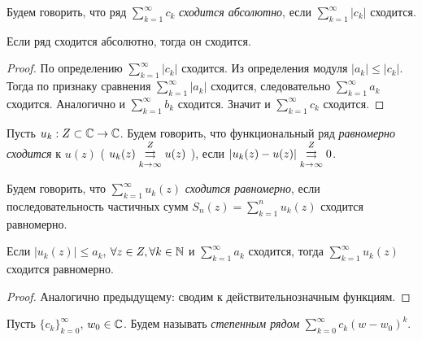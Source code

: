 \documentclass[../main.tex]{subfiles}
\begin{document}
\begin{definition}
    Будем говорить, что ряд $ \sum_{k=1}^{\infty} c_k $ \emph{сходится абсолютно}, если $ \sum_{k=1}^{\infty} \left| c_k  \right|  $ сходится.  
\end{definition}

\begin{proposition}
  Если ряд сходится абсолютно, тогда он сходится.
\end{proposition}


\begin{proof}
  По определению $ \sum_{k=1}^{\infty} \left| c_k  \right|  $ сходится. Из определения модуля $ \left| a_k \right| \leq \left| c_k  \right| $. Тогда по признаку сравнения $ \sum_{k=1}^{\infty} \left| a_k  \right| $ сходится, следовательно $ \sum_{k=1}^{\infty} a_k  $ сходится. Аналогично и $ \sum_{k=1}^{\infty} b_k  $ сходится. Значит и $ \sum_{k=1}^{\infty} c_k  $ сходится.
\end{proof}


\begin{definition}
  Пусть $ u_k : Z \subset \Cm \to \Cm$. Будем говорить, что функциональный ряд \emph{равномерно сходится} к $ u(z)$ ( $ u_k (z) \convergesuniformly{k \to \infty}{Z} u(z)$ ), если $ \left| u_k (z) - u(z) \right| \convergesuniformly{k \to \infty}{Z} 0$.  
\end{definition}


\begin{definition}
  Будем говорить, что $ \sum_{k=1}^{\infty} u_k(z)  $ \emph{ сходится равномерно}, если последовательность частичных сумм $ S_n(z) = \sum_{k=1}^{n} u_k(z)  $  сходится равномерно.
\end{definition}


\begin{proposition}
  Если $ \left| u_k(z)  \right| \leq a_k  $, $ \forall z \in Z, \forall k \in \N$ и $ \sum_{k=1}^{\infty} a_k  $ сходится, тогда $ \sum_{k=1}^{\infty} u_k(z) $ сходится равномерно. 
\end{proposition}


\begin{proof}
  Аналогично предыдущему: сводим к действительнозначным функциям.
\end{proof}


\begin{definition}
  Пусть $ \{ c_{k} \}_{k = 0}^{\infty} $, $ w_0 \in \Cm$. Будем называть \emph{степенным рядом} $ \sum_{k=0}^{\infty} c_k (w - w_0 )^k $.  
\end{definition}
\end{document}
